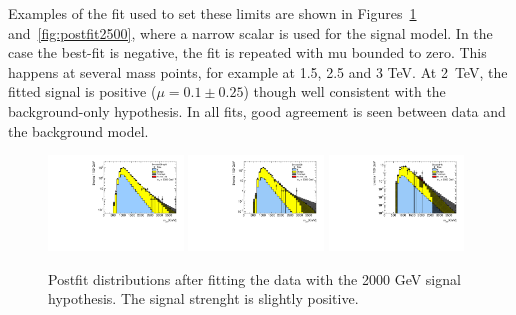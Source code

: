 Examples of the fit used to set these limits are shown in Figures~\ref{fig:postfit2000} and~\ref{fig:postfit2500}, where a narrow scalar is used for the signal model. In the case the best-fit is negative, the fit is repeated with mu bounded to zero. This happens at several mass points, for example at 1.5, 2.5 and 3 TeV. At 2~TeV, the fitted signal is positive ($\mu=0.1\pm0.25$) though well consistent with the background-only hypothesis. In all fits, good agreement is seen between data and the background model.

\begin{figure}[htbp!]
\begin{center}
\includegraphics[width=0.32\textwidth,angle=-90]{figures/boosted/results/postfitplot_s_2000_b2b.pdf} 
\includegraphics[width=0.32\textwidth,angle=-90]{figures/boosted/results/postfitplot_s_2000_b3b.pdf} 
\includegraphics[width=0.32\textwidth,angle=-90]{figures/boosted/results/postfitplot_s_2000_b4b.pdf} 
\caption{Postfit distributions after fitting the data with the 2000 GeV signal hypothesis. The signal strenght is slightly positive.}
\label{fig:postfit2000}
\end{center}
\end{figure}

